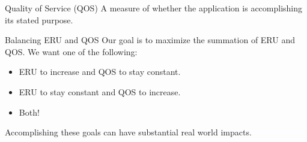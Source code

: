 \documentclass{beamer}
\begin{document}
\begin{frame}{Quality of Service (QOS)}
  A measure of whether the application is accomplishing its stated purpose.


\end{frame}

\begin{frame}{Balancing ERU and QOS}
  Our goal is to maximize the summation of ERU and QOS. We want one of the
  following:

  \begin{itemize}
    \item ERU to increase and QOS to stay constant.
    \item ERU to stay constant and QOS to increase.
    \item Both!
  \end{itemize}

  Accomplishing these goals can have substantial real world impacts.


\end{frame}
\end{document}
